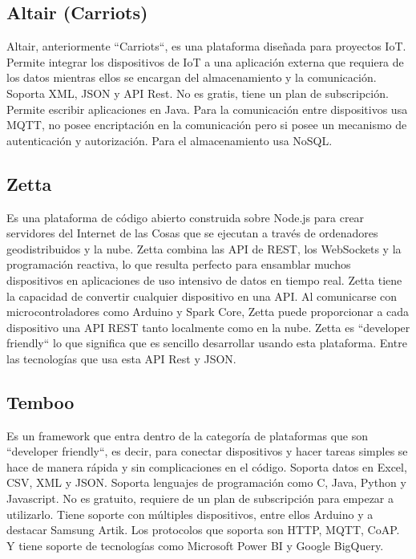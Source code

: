{\subsection{Altair (Carriots)}

Altair, anteriormente ``Carriots``, es una plataforma diseñada para proyectos IoT. Permite integrar los dispositivos de IoT a una aplicación externa que requiera de los datos mientras ellos se encargan del almacenamiento y la comunicación. Soporta XML, JSON y API Rest. No es gratis, tiene un plan de subscripción. Permite escribir aplicaciones en Java. Para la comunicación entre dispositivos usa MQTT, no posee encriptación en la comunicación pero si posee un mecanismo de autenticación y autorización. Para el almacenamiento usa NoSQL. \cite{altair}

\subsection{Zetta}

Es una plataforma de código abierto construida sobre Node.js para crear servidores del Internet de las Cosas que se ejecutan a través de ordenadores geodistribuidos y la nube. Zetta combina las API de REST, los WebSockets y la programación reactiva, lo que resulta perfecto para ensamblar muchos dispositivos en aplicaciones de uso intensivo de datos en tiempo real. Zetta tiene la capacidad de convertir cualquier dispositivo en una API. Al comunicarse con microcontroladores como Arduino y Spark Core, Zetta puede proporcionar a cada dispositivo una API REST tanto localmente como en la nube. Zetta es ``developer friendly`` lo que significa que es sencillo desarrollar usando esta plataforma. Entre las tecnologías que usa esta API Rest y JSON. \cite{zetta}

\subsection{Temboo}

Es un framework que entra dentro de la categoría de plataformas que son ``developer friendly``, es decir, para conectar dispositivos y hacer tareas simples se hace de manera rápida y sin complicaciones en el código. Soporta datos en Excel, CSV, XML y JSON. Soporta lenguajes de programación como C, Java, Python y Javascript. No es gratuito, requiere de un plan de subscripción para empezar a utilizarlo. Tiene soporte con múltiples dispositivos, entre ellos Arduino y a destacar Samsung Artik. Los protocolos que soporta son HTTP, MQTT, CoAP. Y tiene soporte de tecnologías como Microsoft Power BI y Google BigQuery. \cite{temboo}

}
